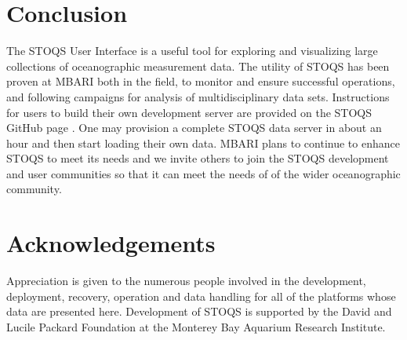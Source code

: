 \documentclass[conference]{IEEEtran}
\begin{document}
\section{Conclusion}
The STOQS User Interface is a useful tool for exploring and visualizing 
large collections  of oceanographic measurement data.  
The utility of STOQS has been proven at MBARI both in 
the field, to monitor and ensure successful operations, and
following campaigns for analysis of multidisciplinary data sets.
Instructions for users to build their own development server are provided
on the STOQS GitHub page \cite{stoqs_github}. One may provision a 
complete STOQS data server in about an hour and then start loading their
own data. MBARI plans to continue to enhance STOQS to meet its needs and we
invite others to join the STOQS development and user communities so that it
can meet the needs of of the wider oceanographic community.




\section*{Acknowledgements}

Appreciation is given to the numerous people involved in the development, 
deployment, recovery, operation and data handling for all of the platforms 
whose data are presented here. Development of STOQS is supported by the 
David and Lucile Packard Foundation at the Monterey Bay Aquarium Research Institute.








%




\end{document}
